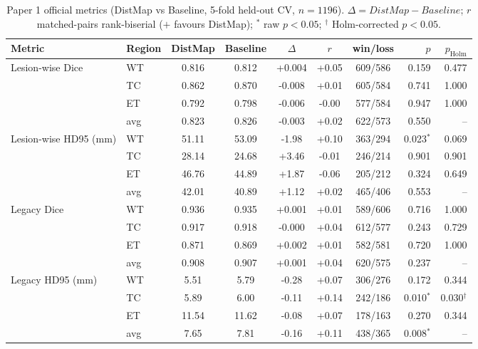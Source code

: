 \begin{table}[t]
\centering
\caption{Paper 1 official metrics (DistMap vs Baseline, 5-fold held-out CV, $n=1196$). $\Delta=DistMap-Baseline$; $r$ matched-pairs rank-biserial ($+$ favours DistMap); $^{*}$ raw $p<0.05$; $^{\dagger}$ Holm-corrected $p<0.05$.}
\label{tab:p1_main}
\begin{tabular}{llcccccrr}
\toprule
Metric & Region & DistMap & Baseline & $\Delta$ & $r$ & win/loss & $p$ & $p_{\mathrm{Holm}}$ \\
\midrule
\multirow{4}{*}{Lesion-wise Dice} & WT & 0.816 & 0.812 & +0.004 & +0.05 & 609/586 & 0.159 & 0.477 \\
 & TC & 0.862 & 0.870 & -0.008 & +0.01 & 605/584 & 0.741 & 1.000 \\
 & ET & 0.792 & 0.798 & -0.006 & -0.00 & 577/584 & 0.947 & 1.000 \\
 & avg & 0.823 & 0.826 & -0.003 & +0.02 & 622/573 & 0.550 & -- \\
\midrule
\multirow{4}{*}{Lesion-wise HD95 (mm)} & WT & 51.11 & 53.09 & -1.98 & +0.10 & 363/294 & 0.023$^{*}$ & 0.069 \\
 & TC & 28.14 & 24.68 & +3.46 & -0.01 & 246/214 & 0.901 & 0.901 \\
 & ET & 46.76 & 44.89 & +1.87 & -0.06 & 205/212 & 0.324 & 0.649 \\
 & avg & 42.01 & 40.89 & +1.12 & +0.02 & 465/406 & 0.553 & -- \\
\midrule
\multirow{4}{*}{Legacy Dice} & WT & 0.936 & 0.935 & +0.001 & +0.01 & 589/606 & 0.716 & 1.000 \\
 & TC & 0.917 & 0.918 & -0.000 & +0.04 & 612/577 & 0.243 & 0.729 \\
 & ET & 0.871 & 0.869 & +0.002 & +0.01 & 582/581 & 0.720 & 1.000 \\
 & avg & 0.908 & 0.907 & +0.001 & +0.04 & 620/575 & 0.237 & -- \\
\midrule
\multirow{4}{*}{Legacy HD95 (mm)} & WT & 5.51 & 5.79 & -0.28 & +0.07 & 306/276 & 0.172 & 0.344 \\
 & TC & 5.89 & 6.00 & -0.11 & +0.14 & 242/186 & 0.010$^{*}$ & 0.030$^{\dagger}$ \\
 & ET & 11.54 & 11.62 & -0.08 & +0.07 & 178/163 & 0.270 & 0.344 \\
 & avg & 7.65 & 7.81 & -0.16 & +0.11 & 438/365 & 0.008$^{*}$ & -- \\
\midrule
\bottomrule
\end{tabular}
\end{table}

